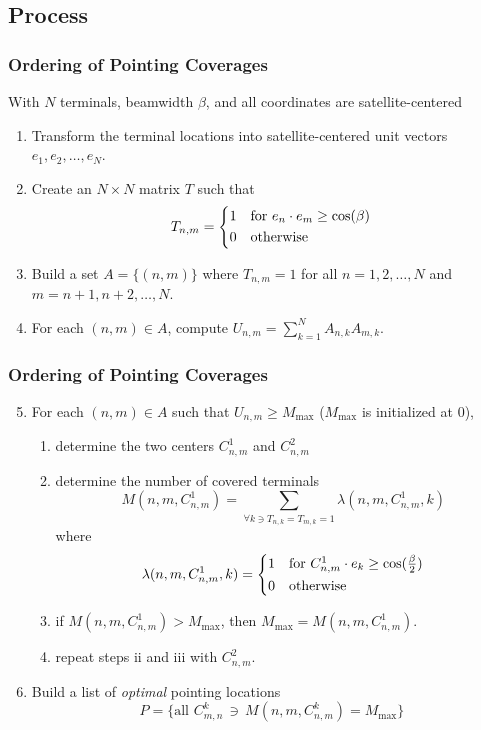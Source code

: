 \documentclass[aspectratio=169]{beamer}
\begin{document}
\subsection{Process}
\begin{frame}
\frametitle{Ordering of Pointing Coverages\footnotemark}
With $N$ terminals, beamwidth $\beta$, and all coordinates are satellite-centered

\begin{enumerate}
\item Transform the terminal locations into satellite-centered unit vectors $e_1, e_2, \ldots, e_N$.
\item Create an $N \times N$ matrix $T$ such that
\[
T_{n,m} = \begin{dcases*}
1 & for $e_n \cdot e_m \geq \cos(\beta) $\\ 
0 & otherwise
\end{dcases*}
\]

\item Build a set $A = \{(n,m)\}$ where $T_{n,m}=1$  for all $ n=1,2,\ldots,N$ and $ m=n+1,n+2, \ldots,N$.

\item For each $(n,m) \in A$, compute $U_{n,m} = \sum_{k=1}^{N} A_{n,k} A_{m,k} $.
\end{enumerate}
\end{frame}




\begin{frame}
\frametitle{Ordering of Pointing Coverages}
\begin{enumerate}
\setcounter{enumi}{4}
\item For  each $(n,m) \in A$ such that $U_{n,m} \geq M_{\text{max}}$ ($M_{\text{max}}$ is initialized at 0), 
\begin{enumerate}[i]
	\item determine the two centers $C^{1}_{n,m}$ and $C^{2}_{n,m}$
	\item determine the number of covered terminals
		\[ M(n,m,C^{1}_{n,m}) = \sum_{\forall k \ni T_{n,k}=T_{m,k}=1} \lambda(n,m,C^{1}_{n,m}, k)  \]
		where
		\[  \lambda(n,m,C^{1}_{n,m}, k)  =  \begin{dcases*}
												1 & for $C^{1}_{n,m} \cdot e_k \geq \cos(\frac{\beta}{2})$\\
												0 & otherwise
												\end{dcases*}
												\]
	\item if $ M(n,m,C^{1}_{n,m}) > M_{\text{max}}$, then $M_{\text{max}} = M(n,m,C^{1}_{n,m})$.
	\item repeat steps ii and iii with $C^{2}_{n,m}$.
\end{enumerate}
\item Build a list of {\em optimal} pointing locations \[P = \{\text{all } C^{k}_{m,n} \, \ni \,  M(n,m,C^{k}_{n,m}) =M_{\text{max}} \}\]
\end{enumerate}
\end{frame}
\end{document}

